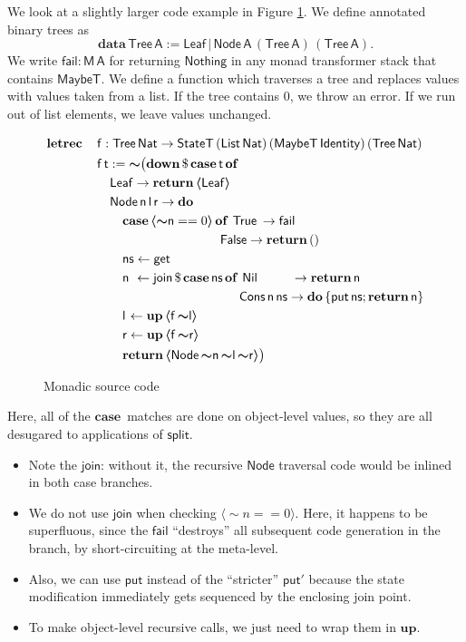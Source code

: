 \documentclass[acmsmall,screen]{acmart}
\newcommand{\mit}[1]{{\mathsf{#1}}}
\newcommand{\msf}[1]{{\mathsf{#1}}}
\newcommand{\mbf}[1]{{\mathbf{#1}}}
\newcommand{\bs}[1]{\boldsymbol{#1}}
\newcommand{\mdo}{\mbf{do}\,}
\newcommand{\ind}{\hspace{1em}}
\newcommand{\return}{\mbf{return}\,}
\newcommand{\data}{\mbf{data}\,}
\newcommand{\letrec}{\mbf{letrec}\,}
\newcommand{\of}{\mbf{of}\,}
\newcommand{\vn}{\mathsf{n}}
\newcommand{\vA}{\mathsf{A}}
\newcommand{\vf}{\mathsf{f}}
\newcommand{\vt}{\mathsf{t}}
\newcommand{\vr}{\mathsf{r}}
\newcommand{\vl}{\mathsf{l}}
\newcommand{\vns}{\mathsf{ns}}
\newcommand{\List}{\msf{List}}
\newcommand{\Tree}{\msf{Tree}}
\newcommand{\Node}{\msf{Node}}
\newcommand{\Leaf}{\msf{Leaf}}
\newcommand{\Nil}{\msf{Nil}}
\newcommand{\Cons}{\msf{Cons}}
\newcommand{\fro}{\leftarrow}
\newcommand{\case}{\mbf{case\,}}
\newcommand{\spl}{{\bs{\sim}}}
\newcommand{\ql}{{\bs{\langle}}}
\newcommand{\qr}{{\bs{\rangle}}}
\newcommand{\True}{\msf{True}}
\newcommand{\False}{\msf{False}}
\newcommand{\Nat}{\msf{Nat}}
\newcommand{\MaybeT}{\msf{MaybeT}}
\newcommand{\Nothing}{\msf{Nothing}}
\theoremstyle{remark}
\newcommand{\mup}{\mbf{up}}
\newcommand{\mdown}{\mbf{down}}
\newcommand{\qt}[1]{\ql#1\qr}
\newcommand{\StateT}{\msf{StateT}}
\newcommand{\Identity}{\msf{Identity}}
\newcommand{\dlr}{\,\$\,}
\newcommand{\join}{\mit{join}}
\newcommand{\get}{\mit{get}}
\begin{document}
We look at a slightly larger code example in Figure \ref{fig:codeinp}. We define
annotated binary trees as
\[ \data \Tree\,\vA := \Leaf\,|\,\Node\,\vA\,(\Tree\,\vA)\,(\Tree\,\vA). \]
We write $\msf{fail : M\,A}$ for returning $\Nothing$ in any monad transformer
stack that contains $\MaybeT$. We define a function which traverses a tree and
replaces values with values taken from a list. If the tree contains $0$, we
throw an error. If we run out of list elements, we leave values unchanged.
\begin{figure}
\begin{alignat*}{4}
  &  \letrec &&\vf : \Tree\,\Nat \to \StateT\,(\List\,\Nat)\,(\MaybeT\,\Identity)\,(\Tree\,\Nat) \\
  &          &&\vf\,\vt := \spl \big(\mdown \dlr \case \vt\,\of\\
  &          &&\ind \Leaf \to \return \qt{\Leaf} \\
  &          &&\ind \Node\,\vn\,\vl\,\vr \to \mdo\\
  &          &&\ind \ind \case \qt{\spl \vn == 0}\,\of\,\True \hspace{0.2em}\to \msf{fail}\\
  &          &&\ind \ind \ind \hspace{6.7em}             \False \to \return () \\
  &          &&\ind \ind \vns \fro \get \\
  &          &&\ind \ind \vn\hspace{0.35em}\fro\join \dlr \case \vns\,\of\,\Nil \hspace{2.65em}\to \return \vn \\
  &          &&\ind \ind \ind \hspace{8.2em}\Cons\,\vn\,\vns \to \mdo \{\msf{put}\,\vns; \return \vn\} \\
  &          &&\ind \ind \vl\hspace{0.1em} \fro \mup\,\qt{\vf\,\spl \vl} \\
  &          &&\ind \ind \vr \fro \mup\,\qt{\vf\,\spl \vr} \\
  &          &&\ind \ind \return \qt{\Node\,\spl \vn\,\spl \vl\,\spl \vr}\big)
\end{alignat*}
\caption{Monadic source code}
\label{fig:codeinp}
\end{figure}
Here, all of the $\case$ matches are done on object-level values, so they are
all desugared to applications of $\msf{split}$.
\begin{itemize}
\item Note the $\join$: without it, the recursive $\Node$ traversal code would be inlined in both case branches.
\item We do not use $\join$ when checking $\qt{\spl n == 0}$. Here, it
      happens to be superfluous, since the $\msf{fail}$ ``destroys'' all subsequent
      code generation in the branch, by short-circuiting at the meta-level.
\item Also, we can use $\msf{put}$ instead of the ``stricter'' $\msf{put'}$ because
      the state modification immediately gets sequenced by the enclosing join point.
\item To make object-level recursive calls, we just need to wrap them in $\mup$.
\end{itemize}
\end{document}
